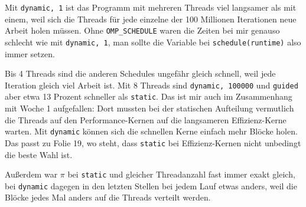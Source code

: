 \documentclass[11pt]{article}
\begin{document}
Mit \texttt{dynamic, 1} ist das Programm mit mehreren Threads viel langsamer als mit einem, weil
sich die Threads für jede einzelne der 100 Millionen Iterationen neue Arbeit holen müssen. Ohne
\texttt{OMP\_SCHEDULE} waren die Zeiten bei mir genauso schlecht wie mit \texttt{dynamic, 1}, man
sollte die Variable bei \texttt{schedule(runtime)} also immer setzen.

Bis 4 Threads sind die anderen Schedules ungefähr gleich schnell, weil jede Iteration gleich viel
Arbeit ist. Mit 8 Threads sind \texttt{dynamic, 100000} und \texttt{guided} aber etwa 13 Prozent
schneller als \texttt{static}. Das ist mir auch im Zusammenhang mit Woche 1 aufgefallen: Dort
mussten bei der statischen Aufteilung vermutlich die Threads auf den Performance-Kernen auf die
langsameren Effizienz-Kerne warten. Mit \texttt{dynamic} können sich die schnellen Kerne einfach
mehr Blöcke holen.
Das passt zu Folie 19, wo steht, dass \texttt{static} bei Effizienz-Kernen nicht unbedingt die
beste Wahl ist.

Außerdem war $\pi$ bei \texttt{static} und gleicher Threadanzahl fast immer exakt gleich, bei
\texttt{dynamic} dagegen in den letzten Stellen bei jedem Lauf etwas anders, weil die Blöcke jedes
Mal anders auf die Threads verteilt werden.
\end{document}

